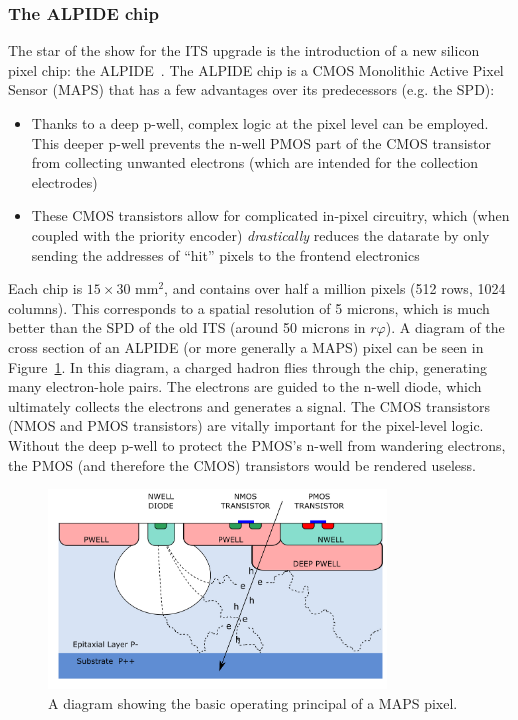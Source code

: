 \subsubsection{The ALPIDE chip}
The star of the show for the ITS upgrade is the introduction of a new silicon pixel chip: the ALPIDE~\cite{ALPIDE}. The ALPIDE chip is a CMOS Monolithic Active Pixel Sensor (MAPS) that has a few advantages over its predecessors (e.g. the SPD):
\begin{itemize}
    \item Thanks to a deep p-well, complex logic at the pixel level can be employed. This deeper p-well prevents the n-well PMOS part of the CMOS transistor from collecting unwanted electrons (which are intended for the collection electrodes)
    \item These CMOS transistors allow for complicated in-pixel circuitry, which (when coupled with the priority encoder) \textit{drastically} reduces the datarate by only sending the addresses of ``hit'' pixels to the frontend electronics
\end{itemize}
Each chip is $15\times30$ mm$^2$, and contains over half a million pixels (512 rows, 1024 columns). This corresponds to a spatial resolution of 5 microns, which is much better than the SPD of the old ITS (around 50 microns in $r\varphi$). A diagram of the cross section of an ALPIDE (or more generally a MAPS) pixel can be seen in Figure~\ref{fig:alpide_diagram}. In this diagram, a charged hadron flies through the chip, generating many electron-hole pairs. The electrons are guided to the n-well diode, which ultimately collects the electrons and generates a signal. The CMOS transistors (NMOS and PMOS transistors) are vitally important for the pixel-level logic. Without the deep p-well to protect the PMOS's n-well from wandering electrons, the PMOS (and therefore the CMOS) transistors would be rendered useless.

\begin{figure}
    \centering
    \includegraphics[width=0.8\textwidth]{figures/experiment/alpide_cross.png}
    \caption{A diagram showing the basic operating principal of a MAPS pixel.}
    \label{fig:alpide_diagram}
\end{figure}

